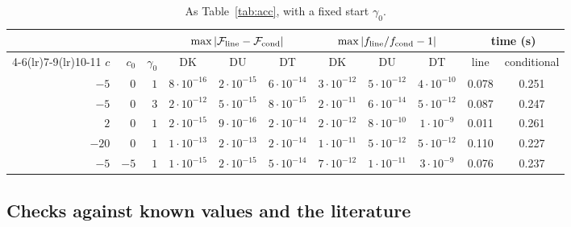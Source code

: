 \documentclass[ecta,nameyear,final,supplement]{econsocart}
\newcommand{\Fk}{\textsf{\upshape DK}}
\newcommand{\Fu}{\textsf{\upshape DU}}
\newcommand{\Ft}{\textsf{\upshape DT}}
\newcommand{\cF}{\mathcal{F}}
\theoremstyle{plain}
\theoremstyle{definition}
\begin{document}
\begin{table}[tbp]
\caption{As Table~\ref{tab:acc}, with a fixed start $\gamma_0$.}
\label{tab:accfixed}
\begin{center}
\footnotesize
\setlength{\tabcolsep}{4pt}
\begin{tabular}{rrrcccccccc}
\toprule
 & & & \multicolumn{3}{c}{$\max|\cF_{\rm line}-\cF_{\rm cond}|$} & \multicolumn{3}{c}{$\max|f_{\rm line}/f_{\rm cond}-1|$} & \multicolumn{2}{c}{time (s)}\\
\cmidrule(lr){4-6}\cmidrule(lr){7-9}\cmidrule(lr){10-11}
$c$ & $c_0$ & $\gamma_0$ & \Fk & \Fu & \Ft & \Fk & \Fu & \Ft & line & conditional\\
\midrule
$-5$ & $0$ & $1$ & $8\cdot10^{-16}$ & $2\cdot10^{-15}$ & $6\cdot10^{-14}$ & $3\cdot10^{-12}$ & $5\cdot10^{-12}$ & $4\cdot10^{-10}$ & 0.078 & 0.251\\
$-5$ & $0$ & $3$ & $2\cdot10^{-12}$ & $5\cdot10^{-15}$ & $8\cdot10^{-15}$ & $2\cdot10^{-11}$ & $6\cdot10^{-14}$ & $5\cdot10^{-12}$ & 0.087 & 0.247\\
$2$ & $0$ & $1$ & $2\cdot10^{-15}$ & $9\cdot10^{-16}$ & $2\cdot10^{-14}$ & $2\cdot10^{-12}$ & $8\cdot10^{-10}$ & $1\cdot10^{-9}$ & 0.011 & 0.261\\
$-20$ & $0$ & $1$ & $1\cdot10^{-13}$ & $2\cdot10^{-13}$ & $2\cdot10^{-14}$ & $1\cdot10^{-11}$ & $5\cdot10^{-12}$ & $5\cdot10^{-12}$ & 0.110 & 0.227\\
$-5$ & $-5$ & $1$ & $1\cdot10^{-15}$ & $2\cdot10^{-15}$ & $5\cdot10^{-14}$ & $7\cdot10^{-12}$ & $1\cdot10^{-11}$ & $3\cdot10^{-9}$ & 0.076 & 0.237\\
\bottomrule
\end{tabular}
\end{center}
\end{table}


\subsection{Checks against known values and the literature}
\label{sec:checks}
\end{document}
